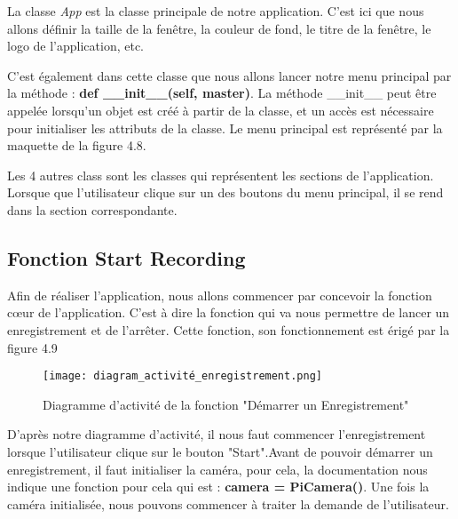             La classe \textit{App} est la classe principale de notre application.
            C'est ici que nous allons définir la taille de la fenêtre, la couleur de fond, le titre de la fenêtre, le logo de l'application, etc.

            \vspace{0.2cm}

            C'est également dans cette classe que nous allons lancer notre menu principal par la méthode : \textbf{def \_\_init\_\_(self, master)}. La méthode \_\_init\_\_ peut être appelée lorsqu'un objet est créé à partir de la classe, et un accès est nécessaire pour initialiser les attributs de la classe. Le menu principal est représenté par la maquette de la figure 4.8.

            \vspace{0.2cm}

            Les 4 autres class sont les classes qui représentent les sections de l'application.
            Lorsque que l'utilisateur clique sur un des boutons du menu principal, il se rend dans la section correspondante.
        
        \subsection{Fonction Start Recording}
            Afin de réaliser l'application, nous allons commencer par concevoir la fonction cœur de l'application.
            C'est à dire la fonction qui va nous permettre de lancer un enregistrement et de l'arrêter.    
            Cette fonction, son fonctionnement est érigé par la figure 4.9

            \begin{figure}[ht]
                \centering
                \texttt{[image: diagram\_activité\_enregistrement.png]} 
                \caption{Diagramme d'activité de la fonction "Démarrer un Enregistrement"}
            \end{figure}

            
            D'après notre diagramme d'activité, il nous faut commencer l'enregistrement lorsque l'utilisateur clique sur le bouton "Start".Avant de pouvoir démarrer un enregistrement, il faut initialiser la caméra, pour cela, la documentation nous indique une fonction pour cela qui est : \textbf{camera = PiCamera()}. Une fois la caméra initialisée, nous pouvons commencer à traiter la demande de l'utilisateur.

